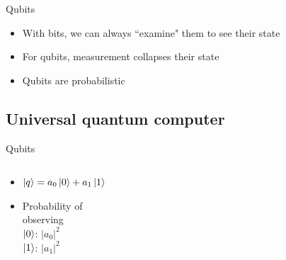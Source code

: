 \documentclass[14pt]{beamer}
\let\olditem\item
\renewcommand{\item}{%
\olditem\vspace{10pt}}
\begin{document}
\begin{frame}{Qubits}
\begin{itemize}
	\item With bits, we can always ``examine" them to see their state
	\item For qubits, measurement collapses their state
	\item Qubits are probabilistic 
\end{itemize}
\end{frame}

\subsection{Universal quantum computer}
\begin{frame}{Qubits}
\begin{columns}[T]
	\begin{column}{.5\textwidth}
		\begin{block}{}
			\begin{itemize}
				\item $\ket{q} = a_0 \ket{0} + a_1 \ket{1}$
				\item Probability of \\ observing \\ 
						$\ket{0}$: $|a_0|^2$ \\
						$\ket{1}$: $|a_1|^2$
			\end{itemize}
    	\end{block}
	\end{column}
	\begin{column}{.5\textwidth}
    	\begin{block}{}

\end{block}
\end{column}
\end{columns}
\end{frame}
\end{document}
